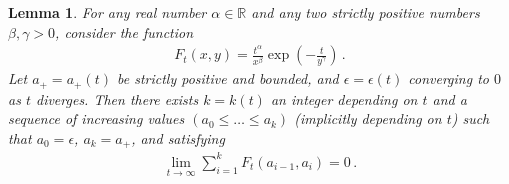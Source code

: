 \documentclass{article}
\newcommand{\1}{\mathbbm{1}}								%
\newtheorem{lemma}[theorem]{Lemma}
\theoremstyle{definition}
\numberwithin{equation}{section}
\newcommand{\R}{\mathbb R}
\begin{document}
\begin{lemma}\label{lem:useful-bound}
    For any real number $\alpha\in\R$ and any two strictly positive numbers $\beta,\gamma>0$, consider the function
    \begin{align*}
        F_t(x,y)=\frac{t^\alpha}{x^\beta}\exp\left(-\frac{t}{y^\gamma}\right)\,.
    \end{align*}
    Let $a_+=a_+(t)$ be strictly positive and bounded, and $\epsilon=\epsilon(t)$ converging to $0$ as $t$ diverges. 
    Then there exists $k=k(t)$ an integer depending on $t$ and a sequence of increasing values $(a_0\leq\ldots\leq a_k)$ (implicitly depending on $t$) such that $a_0=\epsilon$, $a_k=a_+$, and satisfying
    \begin{align*}
        \lim_{t\rightarrow\infty}\sum_{i=1}^kF_t(a_{i-1},a_i)=0\,.
    \end{align*}
\end{lemma}
\end{document}
